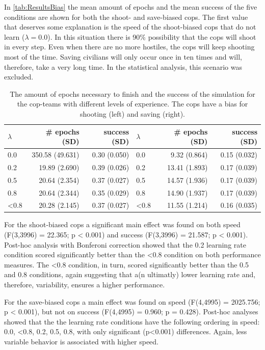 In \autoref{tab:ResultsBias} the mean amount of epochs and the mean success of the five conditions are shown for both the shoot- and save-biased cops. The first value that deserves some explanation is the speed of the shoot-biased cops that do not learn ($\lambda = 0.0$). In this situation there is 90\% possibility that the cops will shoot in every step. Even when there are no more hostiles, the cops will keep shooting most of the time. Saving civilians will only occur once in ten times and will, therefore, take a very long time. In the statistical analysis, this scenario was excluded. 
\begin{table}
\begin{center}
\begin{tabular}{l r  r | l r  r}
$\lambda$ &  \# epochs (SD) & success (SD) & $\lambda$ &  \# epochs (SD) & success (SD)\\
\hline
0.0 & 350.58 (49.631) & 0.30 (0.050) & 0.0 & 9.32 (0.864) & 0.15 (0.032)\\
0.2 & 19.89 (2.690) & 0.39 (0.026) & 0.2 & 13.41 (1.893) & 0.17 (0.039)\\
0.5 & 20.64 (2.354) & 0.37 (0.027) & 0.5 & 14.57 (1.936) & 0.17 (0.039)\\
0.8 & 20.64 (2.344) & 0.35 (0.029) & 0.8 & 14.90 (1.937) & 0.17 (0.039)\\
<0.8 & 20.28 (2.145) & 0.37 (0.027) & <0.8 & 11.55 (1.214) & 0.16 (0.035)\\
\hline
\end{tabular}
\caption{The amount of epochs necessary to finish and the success of the simulation for the cop-teams with different levels of experience. The cops have a bias for shooting (left) and saving (right).}
\label{tab:ResultsBias}
\end{center}
\end{table}
For the shoot-biased cops a significant main effect was found on both speed (F(3,3996) = 22.365; p < 0.001) and success (F(3,3996) = 21.587; p < 0.001). Post-hoc analysis with Bonferoni correction showed that the 0.2 learning rate condition scored significantly better than the <0.8 condition on both performance measures. The <0.8 condition, in turn, scored significantly better than the 0.5 and 0.8 conditions, again suggesting that a(n ultimatly) lower learning rate and, therefore, variability, ensures a higher performance. 

For the save-biased cops a main effect was found on speed (F(4,4995) = 2025.756; p < 0.001), but not on success (F(4,4995) = 0.960; p = 0.428). Post-hoc analyses showed that the the learning rate conditions have the following ordering in speed: 0.0, <0.8, 0.2, 0.5, 0.8, with only significant (p<0.001) differences. Again, less variable behavior is associated with higher speed.

